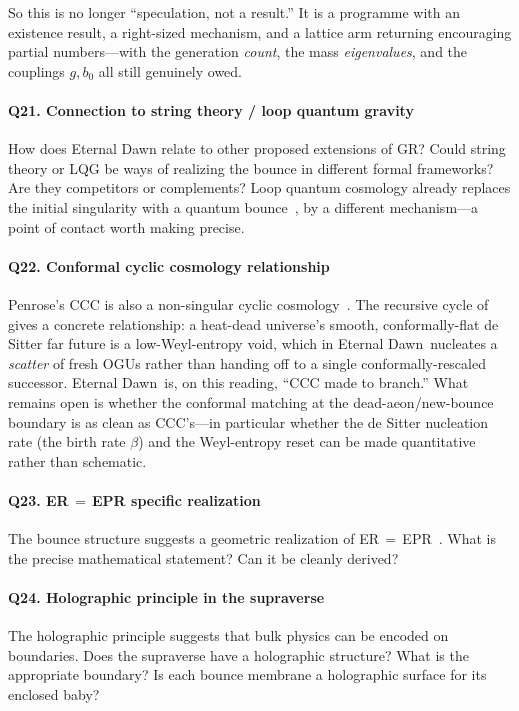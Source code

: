 So this is no longer ``speculation, not a result.'' It is a programme with an existence result, a
right-sized mechanism, and a lattice arm returning encouraging partial numbers---with the generation
\emph{count}, the mass \emph{eigenvalues}, and the couplings $g,b_0$ all still genuinely owed.

\paragraph{Q21. Connection to string theory / loop quantum gravity}
How does Eternal Dawn relate to other proposed extensions of GR? Could string theory or
LQG be ways of realizing the bounce in different formal frameworks? Are they
competitors or complements? Loop quantum cosmology already replaces the initial
singularity with a quantum bounce~\citep{ashtekar2006}, by a different
mechanism---a point of contact worth making precise.

\paragraph{Q22. Conformal cyclic cosmology relationship}
Penrose's CCC is also a non-singular cyclic cosmology~\citep{penrose2010}. The
recursive cycle of  gives a concrete relationship: a
heat-dead universe's smooth, conformally-flat de Sitter far future is a
low-Weyl-entropy void, which in Eternal Dawn\ nucleates a \emph{scatter} of fresh OGUs rather
than handing off to a single conformally-rescaled successor. Eternal Dawn\ is, on this
reading, ``CCC made to branch.'' What remains open is whether the conformal
matching at the dead-aeon/new-bounce boundary is as clean as CCC's---in particular
whether the de Sitter nucleation rate (the birth rate $\beta$) and the Weyl-entropy
reset can be made quantitative rather than schematic.

\paragraph{Q23. ER\,$=$\,EPR specific realization}
The bounce structure suggests a geometric realization of
ER\,$=$\,EPR~\citep{maldacena2013}. What is
the precise mathematical statement? Can it be cleanly derived?

\paragraph{Q24. Holographic principle in the supraverse}
The holographic principle suggests that bulk physics can be encoded on
boundaries. Does the supraverse have a holographic structure? What is the
appropriate boundary? Is each bounce membrane a holographic surface for its
enclosed baby?

